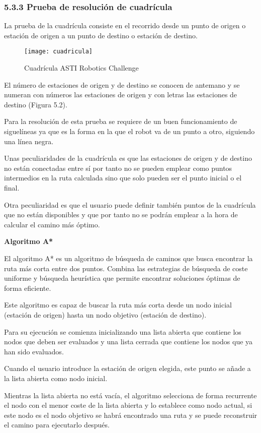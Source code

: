 \subsubsection{5.3.3 Prueba de resolución de cuadrícula}\label{cuadrícula}

La prueba de la cuadrícula consiste en el recorrido desde un punto de origen o estación de origen a un punto de destino o estación de destino.

\begin{figure}[h]
	\centering
	\texttt{[image: cuadricula]}
	\caption{Cuadrícula ASTI Robotics Challenge}
	\label{fig:5.2}
\end{figure}

El número de estaciones de origen y de destino se conocen de antemano y se numeran con números las estaciones de origen y con letras las estaciones de destino (Figura 5.2).

Para la resolución de esta prueba se requiere de un buen funcionamiento de siguelíneas ya que es la forma en la que el robot va de un punto a otro, siguiendo una línea negra.

Unas peculiaridades de la cuadrícula es que las estaciones de origen y de destino no están conectadas entre sí por tanto no se pueden emplear como puntos intermedios en la ruta calculada sino que solo pueden ser el punto inicial o el final.

Otra peculiaridad es que el usuario puede definir también puntos de la cuadrícula que no están disponibles y que por tanto no se podrán emplear a la hora de calcular el camino más óptimo.

\textbf{Algoritmo A*}

El algoritmo A* es un algoritmo de búsqueda de caminos que busca encontrar la ruta más corta entre dos puntos. 
Combina las estrategias de búsqueda de coste uniforme y búsqueda heurística que permite encontrar soluciones óptimas de forma eficiente.

Este algoritmo es capaz de buscar la ruta más corta desde un nodo inicial (estación de origen) hasta un nodo objetivo (estación de destino).

Para su ejecución se comienza inicializando una lista abierta que contiene los nodos que deben ser evaluados y una lista cerrada que contiene los nodos que ya han sido evaluados.

Cuando el usuario introduce la estación de origen elegida, este punto se añade a la lista abierta como nodo inicial.

Mientras la lista abierta no está vacía, el algoritmo selecciona de forma recurrente el nodo con el menor coste de la lista abierta y lo establece como nodo actual, si este nodo es el nodo objetivo se habrá encontrado una ruta y se puede reconstruir el camino para ejecutarlo después.

